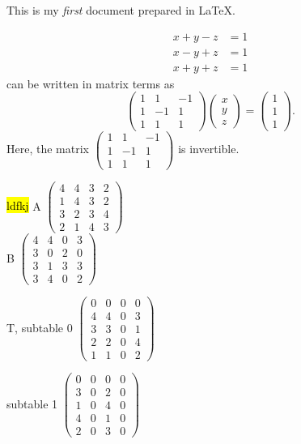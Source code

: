 \documentclass{article}
\begin{document}
  This is my \emph{first} document prepared in \LaTeX.


\begin{align*}
    x+y-z & = 1\\
    x-y+z & = 1\\
    x+y+z & = 1
  \end{align*}
  can be written in matrix terms as
  \begin{equation*}
\begin{pmatrix} 
 1& 1&-1\\
 1&-1& 1\\
  1&1&1
    \end{pmatrix}
    \begin{pmatrix}
x\\ y\\ z
    \end{pmatrix}
    =
    \begin{pmatrix}
1\\ 1\\ 1
    \end{pmatrix}.
  \end{equation*}
  Here, the matrix
  $\begin{pmatrix}
1& 1&-1\\ 1&-1& 1\\ 1&1&1
  \end{pmatrix}$
  is invertible.
  
  \hl{ldfkj}
  A
$\begin{pmatrix}
4&4&3&2\\
1&4&3&2\\
3&2&3&4\\
2&1&4&3
\end{pmatrix}$
\\
\newline
\newline
  B
$\begin{pmatrix}
4&4&0&3\\
3&0&2&0\\
3&1&3&3\\
3&4&0&2
\end{pmatrix}$

T, subtable 0
$\begin{pmatrix}
0&0&0&0\\
4&4&0&3\\
3&3&0&1\\
2&2&0&4\\
1&1&0&2
\end{pmatrix}$

  subtable 1
$\begin{pmatrix}
0&0&0&0\\
3&0&2&0\\
1&0&4&0\\
4&0&1&0\\
2&0&3&0
\end{pmatrix}$
\end{document}
